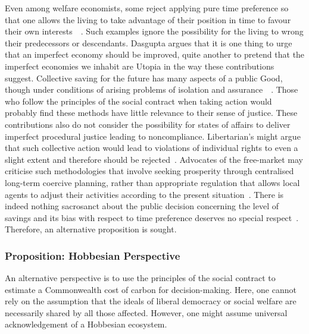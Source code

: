 \documentclass[11pt, oneside]{article}   	%
\begin{document}
Even among welfare economists, some reject applying pure time preference so that one allows the living to take advantage of their position in time to favour their own interests~\cite{hs1}~\cite{fr1}. Such examples ignore the possibility for the living to wrong their predecessors or descendants. Dasgupta argues that it is one thing to urge that an imperfect economy should be improved, quite another to pretend that the imperfect economies we inhabit are Utopia in the way these contributions suggest. Collective saving for the future has many aspects of a public Good, though under conditions of arising problems of isolation and assurance~\cite{as1}~\cite{ms1}.  Those who follow the principles of the social contract when taking action would probably find these methods have little relevance to their sense of justice. These contributions also do not consider the possibility for states of affairs to deliver imperfect procedural justice leading to noncompliance. Libertarian's might argue that such collective action would lead to violations of individual rights to even a slight extent and therefore should be rejected~\cite{rn1}. Advocates of the free-market may criticise such methodologies that involve seeking prosperity through centralised long-term coercive planning, rather than appropriate regulation that allows local agents to adjust their activities according to the present situation~\cite{fh1}. There is indeed nothing sacrosanct about the public decision concerning the level of savings and its bias with respect to time preference deserves no special respect~\cite{jr1}. Therefore, an alternative proposition is sought.

\subsubsection{Proposition: Hobbesian Perspective}

An alternative perspective is to use the principles of the social contract to estimate a Commonwealth cost of carbon for decision-making.
Here, one cannot rely on the assumption that the ideals of liberal democracy or social welfare are necessarily shared by all those affected.
However, one might assume universal acknowledgement of a Hobbesian ecosystem.
\end{document}
